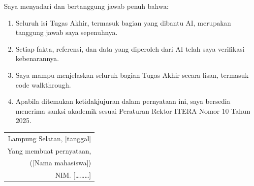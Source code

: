 \vspace{3pt}
\noindent Saya menyadari dan bertanggung jawab penuh bahwa:\par
\vspace{1pt}
\begin{enumerate}[leftmargin=0.635cm,labelsep=0.2cm,itemsep=0.5pt,topsep=0pt,parsep=0pt,label=\arabic*.]
\item Seluruh isi Tugas Akhir, termasuk bagian yang dibantu AI, merupakan tanggung jawab saya sepenuhnya.
\item Setiap fakta, referensi, dan data yang diperoleh dari AI telah saya verifikasi kebenarannya.
\item Saya mampu menjelaskan seluruh bagian Tugas Akhir secara lisan, termasuk code walkthrough.
\item Apabila ditemukan ketidakjujuran dalam pernyataan ini, saya bersedia menerima sanksi akademik sesuai Peraturan Rektor ITERA Nomor 10 Tahun 2025.
\end{enumerate}

\vspace{6pt}
\hfill\begin{tabular}{r@{}}
Lampung Selatan, [tanggal]\\
Yang membuat pernyataan,\\[0.65cm]
([Nama mahasiswa])\\
NIM. [………]
\end{tabular}\par
\endgroup
\clearpage

